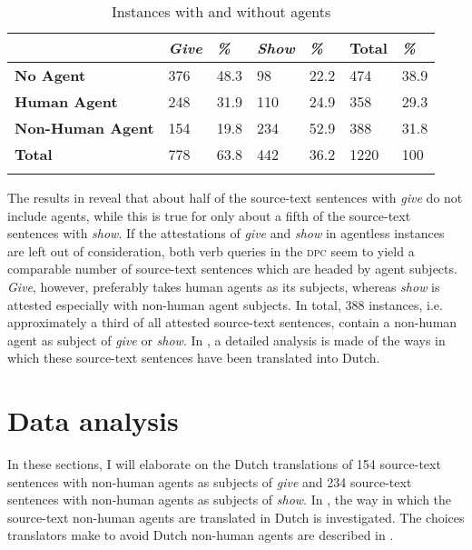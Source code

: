 \documentclass[output=paper]{LSP/langsci}
\begin{document}
\begin{table}
     \centering
     \begin{tabularx}{\textwidth}{XXXXXXX}
     \lsptoprule
                  &  \textit{Give}   & \textit{\%}  & \textit{Show}  & \textit{\%} & Total & \textit{\%} \\ \midrule
       \textbf{No Agent}    & 376    & 48.3          & 98	           & 22.2      & 474   & 38.9 \\
       \textbf{Human Agent} & 248    & 31.9          & 110             & 24.9      & 358   & 29.3  \\
       \textbf{Non-Human Agent} & 154 & 19.8         & 234             & 52.9      & 388   & 31.8 \\  \midrule
       \textbf{Total}       & 778     & 63.8        & 442              & 36.2      & 1220  & 100  \\ 
  \lspbottomrule     
     \end{tabularx}
 
     \caption{Instances with and without agents}
     \label{tab:5.1}
 
   \end{table}

The results in  reveal that about half of the source-text sentences with \textit{give} do not include agents, while this is true for only about a fifth of the source-text sentences with \textit{show}. If the attestations of \textit{give} and \textit{show} in agentless instances are left out of consideration, both verb queries in the \textsc{dpc} seem to yield a comparable number of source-text sentences which are headed by agent subjects. \textit{Give}, however, preferably takes human agents as its subjects, whereas \textit{show} is attested especially with non-human agent subjects. In total, 388 instances, i.e. approximately a third of all attested source-text sentences, contain a non-human agent as subject of \textit{give} or \textit{show}. In , a detailed analysis is made of the ways in which these source-text sentences have been translated into Dutch. 

\section{Data analysis} \label{sec:5:6}

In these sections, I will elaborate on the Dutch translations of 154 source-text sentences with non-human agents as subjects of \textit{give} and 234 source-text sentences with non-human agents as subjects of \textit{show}. In , the way in which the source-text non-human agents are translated in Dutch is investigated. The choices translators make to avoid Dutch non-human agents are described in .
  
\end{document}
